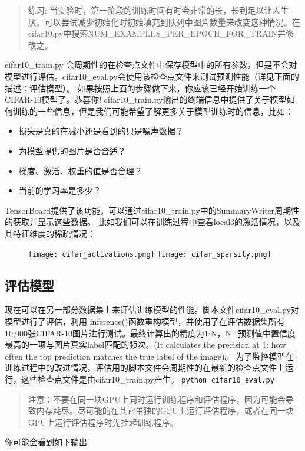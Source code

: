 \begin{quote}
练习: 当实验时，第一阶段的训练时间有时会非常的长，长到足以让人生厌。可以尝试减少初始化时初始填充到队列中图片数量来改变这种情况。在cifar10.py中搜索NUM\_EXAMPLES\_PER\_EPOCH\_FOR\_TRAIN并修改之。
\end{quote}

cifar10\_train.py 会周期性的在检查点文件中保存模型中的所有参数，但是不会对模型进行评估。cifar10\_eval.py会使用该检查点文件来测试预测性能（详见下面的描述：评估模型）。
如果按照上面的步骤做下来，你应该已经开始训练一个CIFAR-10模型了。恭喜你!
cifar10\_train.py输出的终端信息中提供了关于模型如何训练的一些信息，但是我们可能希望了解更多关于模型训练时的信息，比如：
\begin{itemize}
	\item 损失是真的在减小还是看到的只是噪声数据？
	\item 为模型提供的图片是否合适？
	\item 梯度、激活、权重的值是否合理？
	\item 当前的学习率是多少？
\end{itemize}

TensorBoard提供了该功能，可以通过cifar10\_train.py中的SummaryWriter周期性的获取并显示这些数据。
比如我们可以在训练过程中查看local3的激活情况，以及其特征维度的稀疏情况：

\begin{figure}[H]
	\centering
	\texttt{[image: cifar\_activations.png]}
	\texttt{[image: cifar\_sparsity.png]}
\end{figure}

\subsection{评估模型}
现在可以在另一部分数据集上来评估训练模型的性能。脚本文件cifar10\_eval.py对模型进行了评估，利用 inference()函数重构模型，并使用了在评估数据集所有10,000张CIFAR-10图片进行测试。最终计算出的精度为1:N，N=预测值中置信度最高的一项与图片真实label匹配的频次。(It calculates the precision at 1: how often the top prediction matches the true label of the image)。
为了监控模型在训练过程中的改进情况，评估用的脚本文件会周期性的在最新的检查点文件上运行，这些检查点文件是由cifar10\_train.py产生。
\lstinline[language=Bash]{python cifar10_eval.py}

\begin{quote}
注意：不要在同一块GPU上同时运行训练程序和评估程序，因为可能会导致内存耗尽。尽可能的在其它单独的GPU上运行评估程序，或者在同一块GPU上运行评估程序时先挂起训练程序。
\end{quote}
你可能会看到如下输出

